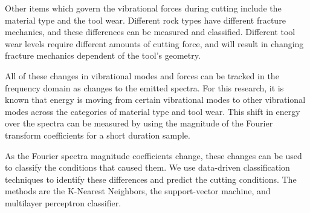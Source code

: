 Other items which govern the vibrational forces during cutting include
the material type and the tool wear. 
Different rock types have different fracture mechanics, 
and these differences can be measured and classified.
Different tool wear levels require different amounts of cutting force,
and will result in changing fracture mechanics dependent of the tool's geometry.

All of these changes in vibrational modes and forces can be tracked in the
frequency domain as changes to the emitted spectra. For this research,
it is known that energy is moving from certain vibrational
modes to other vibrational modes across the categories of material type
and tool wear. This shift in energy over the spectra can be measured
by using the magnitude of the Fourier transform coefficients for a 
short duration sample.

As the Fourier spectra magnitude coefficients change, these changes 
can be used to classify the conditions that caused them.
We use data-driven classification techniques to identify these differences and 
predict the cutting conditions.
The methods are the K-Nearest Neighbors, the support-vector machine, and multilayer perceptron classifier.



